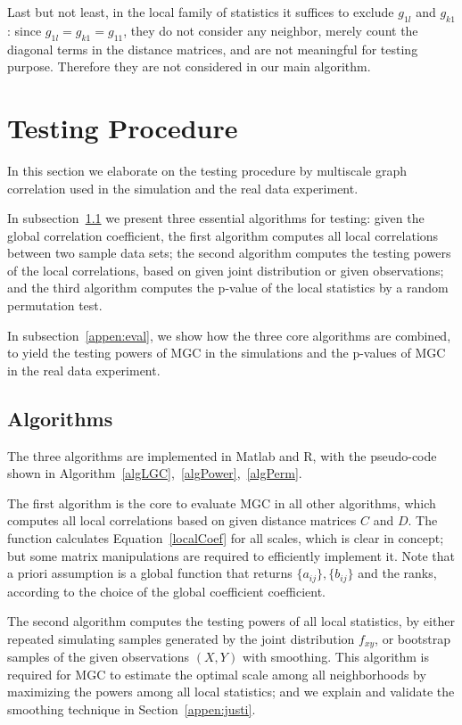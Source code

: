 \documentclass[11pt]{article}
\begin{document}
Last but not least, in the local family of statistics it suffices to exclude $g_{1l}$ and $g_{k1}$: since $g_{1l}=g_{k1}=g_{11}$, they do not consider any neighbor, merely count the diagonal terms in the distance matrices, and are not meaningful for testing purpose. Therefore they are not considered in our main algorithm.

\section{Testing Procedure}
\label{appen:tests}

In this section we elaborate on the testing procedure by multiscale graph correlation used in the simulation and the real data experiment. 

In subsection~\ref{appen:algorithms} we present three essential algorithms for testing: given the global correlation coefficient, the first algorithm computes all local correlations between two sample data sets; the second algorithm computes the testing powers of the local correlations, based on given joint distribution or given observations; and the third algorithm computes the p-value of the local statistics by a random permutation test. 

In subsection~\ref{appen:eval}, we show how the three core algorithms are combined, to yield the testing powers of MGC in the simulations and the p-values of MGC in the real data experiment.

\subsection{Algorithms}
\label{appen:algorithms}
The three algorithms are implemented in Matlab and R, with the pseudo-code shown in Algorithm~\ref{algLGC},~\ref{algPower},~\ref{algPerm}.

The first algorithm is the core to evaluate MGC in all other algorithms, which computes all local correlations based on given distance matrices $C$ and $D$. The function calculates Equation~\ref{localCoef} for all scales, which is clear in concept; but some matrix manipulations are required to efficiently implement it. Note that a priori assumption is a global function that returns $\{a_{ij}\},\{b_{ij}\}$ and the ranks, according to the choice of the global coefficient coefficient.

The second algorithm computes the testing powers of all local statistics, by either repeated simulating samples generated by the joint distribution $f_{xy}$, or bootstrap samples of the given observations $(X, Y)$ with smoothing. This algorithm is required for MGC to estimate the optimal scale among all neighborhoods by maximizing the powers among all local statistics; and we explain and validate the smoothing technique in Section~\ref{appen:justi}.
\end{document}
